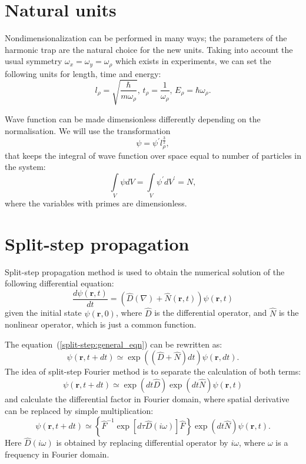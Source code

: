\documentclass[12pt,notitlepage]{report}
\begin{document}
\appendix

\chapter{Natural units}
\label{chapter:natural_units}

Nondimensionalization can be performed in many ways;
the parameters of the harmonic trap are the natural choice for the new units.
Taking into account the usual symmetry $\omega_x = \omega_y = \omega_\rho$ which exists in experiments,
we can set the following units for length, time and energy:
\[
l_\rho =  \sqrt{\frac{\hbar}{m\omega_\rho}},\, t_\rho = \frac{1}{\omega_\rho},\, E_\rho = \hbar \omega_\rho.
\]

Wave function can be made dimensionless differently depending on the normalisation.
We will use the transformation
\[
\psi = \psi^\prime l_\rho^\frac{3}{2},
\]
that keeps the integral of wave function over space equal to number of particles in the system:
\[
\int\limits_V \psi dV = \int\limits_V \psi^\prime dV^\prime = N,
\]
where the variables with primes are dimensionless.

\chapter{Split-step propagation}
\label{chapter:split-step}

Split-step propagation method is used to obtain the numerical solution of the following differential equation:
\begin{equation}
\label{split-step:general_eqn}
\frac{d\psi(\mathbf{r}, t)}{dt} = ( \hat{D}(\nabla) + \hat{N}(\mathbf{r}, t) ) \psi(\mathbf{r}, t)
\end{equation}
given the initial state $\psi(\mathbf{r}, 0)$, 
where $\hat{D}$ is the differential operator, and $\hat{N}$ is the nonlinear operator,
which is just a common function.

The equation~(\ref{split-step:general_eqn}) can be rewritten as:
\[
\psi(\mathbf{r}, t + dt) \simeq \exp ( ( \hat{D} + \hat{N} ) dt ) \psi(\mathbf{r}, dt).
\]
The idea of split-step Fourier method is to separate the calculation of both terms:
\begin{equation}
\label{split-step:split_eqn}
\psi(\mathbf{r}, t + dt) \simeq \exp(dt \hat{D}) \exp(dt \hat{N}) \psi(\mathbf{r}, t)
\end{equation}
and calculate the differential factor in Fourier domain, where spatial derivative can be replaced by simple multiplication:
\[
\psi(\mathbf{r}, t + dt) \simeq \left\{ \hat{F}^{-1} \exp \left[ d\tau \hat{D}(i\omega) \right] \hat{F} \right\}
\exp(dt \hat{N}) \psi(\mathbf{r}, t).
\]
Here $\hat{D}(i\omega)$ is obtained by replacing differential operator by $i \omega$,
where $\omega$ is a frequency in Fourier domain.
\end{document}
